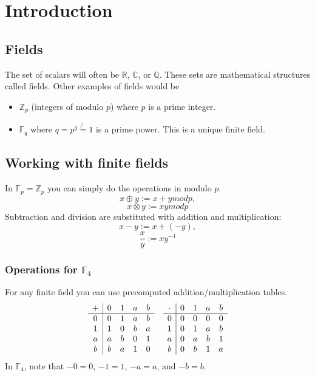 \documentclass[12pt]{article}
\begin{document}

\tableofcontents
\pagebreak

\section{Introduction}
	\subsection{Fields}
	The set of scalars will often be $\mathbb{R}$, $\mathbb{C}$, or $\mathbb{Q}$. These sets are mathematical structures called fields. Other examples of fields would be
	\begin{itemize}
		\item $\mathbb{Z}_p$ (integers of modulo $p$) where $p$ is a prime integer.
		\item $\mathbb{F}_q$ where $q = p^q \not{=} 1$ is a prime power. This is a unique finite field.
	\end{itemize}
	
	\subsection{Working with finite fields}
	In $\mathbb{F}_p = \mathbb{Z}_p$ you can simply do the operations in modulo $p$.
	\[
		x \oplus y := x + y mod p,
	\]
	\[
		x \otimes y := xy mod p
	\]
	Subtraction and division are substituted with addition and multiplication:
	\[
		x - y := x + (-y),
	\]
	\[
		\frac{x}{y} := xy^{-1}
	\]
	
	\subsubsection{Operations for $\mathbb{F}_4$}
	For any finite field you can use precomputed addition/multiplication tables.
	\[
		\begin{array}{c | c c c c}
			+ & 0 & 1 & a & b \\
			\hline
			0 & 0 & 1 & a & b \\
			1 & 1 & 0 & b & a \\ 
			a & a & b & 0 & 1 \\
			b & b & a & 1 & 0
		\end{array}
		\quad
		\begin{array}{c|cccc}
			\cdot & 0 & 1 & a & b \\
			\hline
			0 & 0 & 0 & 0 & 0 \\
			1 & 0 & 1 & a & b \\
			a & 0 & a & b & 1 \\
			b & 0 & b & 1 & a
		\end{array}
	\]
	In $\mathbb{F}_4$, note that $-0 = 0$, $-1 = 1$, $-a = a$, and $-b = b$.
\end{document}
